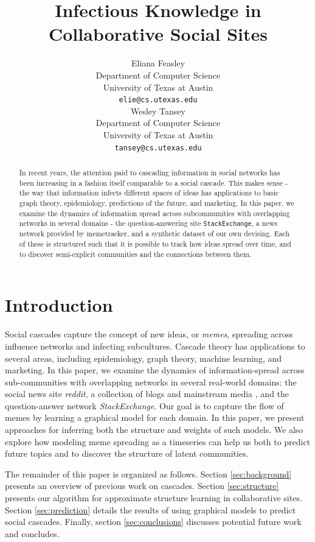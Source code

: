 \documentclass{article} %
\title{Infectious Knowledge in Collaborative Social Sites}
\author{
Eliana Feasley\\
Department of Computer Science\\
University of Texas at Austin\\
\texttt{elie@cs.utexas.edu} \\
\And
Wesley Tansey\\
Department of Computer Science\\
University of Texas at Austin\\
\texttt{tansey@cs.utexas.edu} \\
}
\begin{document}
\maketitle

\begin{abstract}
In recent years, the attention paid to cascading information in social networks has been increasing in a fashion itself comparable to a social cascade. This makes sense - the way that information infects different spaces of ideas has applications to basic graph theory, epidemiology, predictions of the future, and marketing. In this paper, we examine the dynamics of information spread across subcommunities with overlapping networks in several domains - the question-answering site \texttt{StackExchange}, a news network provided by memetracker, and a synthetic dataset of our own devising. Each of these is structured such that it is possible to track how ideas spread over time, and to discover semi-explicit communities and the connections between them.
\end{abstract}

\section{Introduction}
\label{intro}
Social cascades capture the concept of new ideas, or \textit{memes}, spreading across influence networks and infecting subcultures. Cascade theory has applications to several areas, including epidemiology, graph theory, machine learning, and marketing. In this paper, we examine the dynamics of information-spread across sub-communities with overlapping networks in several real-world domains: the social news site \textit{reddit}, a collection of blogs and mainstream media \cite{memetracker}, and the question-answer network \textit{StackExchange}. Our goal is to capture the flow of memes by learning a graphical model for each domain. In this paper, we present approaches for inferring both the structure and weights of such models. We also explore how modeling meme spreading as a timeseries can help us both to predict future topics and to discover the structure of latent communities.

The remainder of this paper is organized as follows. Section \ref{sec:background} presents an overview of previous work on cascades. Section \ref{sec:structure} presents our algorithm for approximate structure learning in collaborative sites. Section \ref{sec:prediction} details the results of using graphical models to predict social cascades. Finally, section \ref{sec:conclusions} discusses potential future work and concludes.
\end{document}

